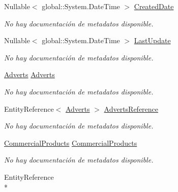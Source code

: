\begin{DoxyCompactItemize}
Nullable$<$ global\-::\-System.\-Date\-Time $>$ \hyperlink{class_game_memory_1_1_game_details_a2d785c106ffd77c7ed2f999bcc6d5749}{Created\-Date}
\begin{DoxyCompactList}\small\item\em No hay documentación de metadatos disponible. \end{DoxyCompactList}\item 
Nullable$<$ global\-::\-System.\-Date\-Time $>$ \hyperlink{class_game_memory_1_1_game_details_a98363629697ab7b4d13bc4fa5ac7c42b}{Last\-Update}
\begin{DoxyCompactList}\small\item\em No hay documentación de metadatos disponible. \end{DoxyCompactList}\item 
\hyperlink{class_game_memory_1_1_adverts}{Adverts} \hyperlink{class_game_memory_1_1_game_details_aef99e5d4941a250335738e4ef9f4e9ac}{Adverts}
\begin{DoxyCompactList}\small\item\em No hay documentación de metadatos disponible. \end{DoxyCompactList}\item 
Entity\-Reference$<$ \hyperlink{class_game_memory_1_1_adverts}{Adverts} $>$ \hyperlink{class_game_memory_1_1_game_details_a52d3aaad97fc57c641ff37f552793da2}{Adverts\-Reference}
\begin{DoxyCompactList}\small\item\em No hay documentación de metadatos disponible. \end{DoxyCompactList}\item 
\hyperlink{class_game_memory_1_1_commercial_products}{Commercial\-Products} \hyperlink{class_game_memory_1_1_game_details_a030903aaea05ae4b5ab820c6e8fa0fd0}{Commercial\-Products}
\begin{DoxyCompactList}\small\item\em No hay documentación de metadatos disponible. \end{DoxyCompactList}\item 
Entity\-Reference\\*

\end{DoxyCompactItemize}
